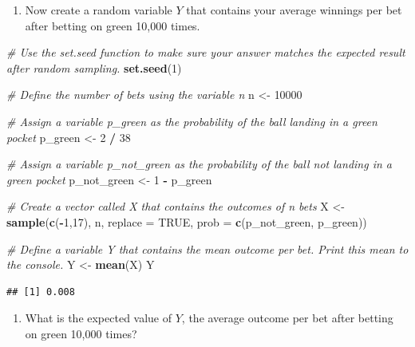 \documentclass[
]{article}
\newenvironment{Shaded}{\begin{snugshade}}{\end{snugshade}}
\newcommand{\CommentTok}[1]{\textcolor[rgb]{0.56,0.35,0.01}{\textit{#1}}}
\newcommand{\DataTypeTok}[1]{\textcolor[rgb]{0.13,0.29,0.53}{#1}}
\newcommand{\DecValTok}[1]{\textcolor[rgb]{0.00,0.00,0.81}{#1}}
\newcommand{\KeywordTok}[1]{\textcolor[rgb]{0.13,0.29,0.53}{\textbf{#1}}}
\newcommand{\NormalTok}[1]{#1}
\newcommand{\OperatorTok}[1]{\textcolor[rgb]{0.81,0.36,0.00}{\textbf{#1}}}
\newcommand{\OtherTok}[1]{\textcolor[rgb]{0.56,0.35,0.01}{#1}}
\newcommand{\StringTok}[1]{\textcolor[rgb]{0.31,0.60,0.02}{#1}}
\providecommand{\tightlist}{%
  \setlength{\itemsep}{0pt}\setlength{\parskip}{0pt}}
\begin{document}
\begin{enumerate}
\def\labelenumi{\arabic{enumi}.}
\setcounter{enumi}{4}
\tightlist
\item
  Now create a random variable \(Y\) that contains your average winnings
  per bet after betting on green 10,000 times.
\end{enumerate}

\begin{Shaded}
\begin{Highlighting}[]
\CommentTok{\# Use the \textasciigrave{}set.seed\textasciigrave{} function to make sure your answer matches the expected result after random sampling.}
\KeywordTok{set.seed}\NormalTok{(}\DecValTok{1}\NormalTok{)}

\CommentTok{\# Define the number of bets using the variable \textquotesingle{}n\textquotesingle{}}
\NormalTok{n \textless{}{-}}\StringTok{ }\DecValTok{10000}

\CommentTok{\# Assign a variable \textasciigrave{}p\_green\textasciigrave{} as the probability of the ball landing in a green pocket}
\NormalTok{p\_green \textless{}{-}}\StringTok{ }\DecValTok{2} \OperatorTok{/}\StringTok{ }\DecValTok{38}

\CommentTok{\# Assign a variable \textasciigrave{}p\_not\_green\textasciigrave{} as the probability of the ball not landing in a green pocket}
\NormalTok{p\_not\_green \textless{}{-}}\StringTok{ }\DecValTok{1} \OperatorTok{{-}}\StringTok{ }\NormalTok{p\_green}

\CommentTok{\# Create a vector called \textasciigrave{}X\textasciigrave{} that contains the outcomes of \textasciigrave{}n\textasciigrave{} bets}
\NormalTok{X \textless{}{-}}\StringTok{ }\KeywordTok{sample}\NormalTok{(}\KeywordTok{c}\NormalTok{(}\OperatorTok{{-}}\DecValTok{1}\NormalTok{,}\DecValTok{17}\NormalTok{), n, }\DataTypeTok{replace =} \OtherTok{TRUE}\NormalTok{, }\DataTypeTok{prob =} \KeywordTok{c}\NormalTok{(p\_not\_green, p\_green))}

\CommentTok{\# Define a variable \textasciigrave{}Y\textasciigrave{} that contains the mean outcome per bet. Print this mean to the console.}
\NormalTok{Y \textless{}{-}}\StringTok{ }\KeywordTok{mean}\NormalTok{(X)}
\NormalTok{Y}
\end{Highlighting}
\end{Shaded}

\begin{verbatim}
## [1] 0.008
\end{verbatim}

\begin{enumerate}
\def\labelenumi{\arabic{enumi}.}
\setcounter{enumi}{5}
\tightlist
\item
  What is the expected value of \(Y\), the average outcome per bet after
  betting on green 10,000 times?
\end{enumerate}
\end{document}
